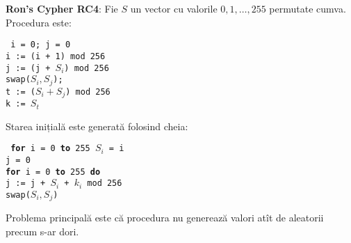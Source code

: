 \begin{example} 
  \textbf{Ron's Cypher RC4}: Fie $ S $ un vector cu valorile $ 0, 1, \dots, 255 $
  permutate cumva. Procedura este:

  \texttt{
    \quad i = 0; j = 0 \\
    \indent\indent\indent i := (i + 1) mod 256 \\
    \indent\indent\indent j := (j + $S_i$) mod 256 \\
    \indent\indent\indent swap($S_i, S_j$); \\
    \indent\indent\indent t := ($S_i + S_j$) mod 256 \\
    \indent\indent\indent k := $S_t$
  }

  Starea inițială este generată folosind cheia:

  \texttt{
    \quad \textbf{for} i = 0 \textbf{to} 255 $ S_i $ = i \\
    \indent\indent j = 0 \\
    \indent\indent \textbf{for} i = 0 \textbf{to} 255 \textbf{do} \\
    \indent\indent\indent j := j + $ S_i $ + $k_i$ mod 256 \\
    \indent\indent\indent swap($S_i, S_j$)
  }

  Problema principală este că procedura nu generează valori atît de aleatorii
  precum s-ar dori.
\end{example}

